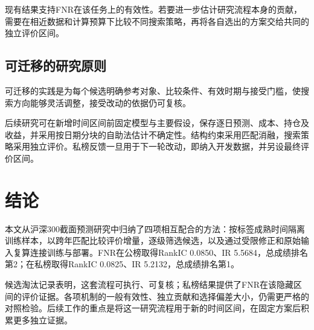\documentclass[UTF8,11pt,a4paper,fontset=fandol]{ctexart}
\begin{document}
现有结果支持FNR在该任务上的有效性。若要进一步估计研究流程本身的贡献，需要在相近数据和计算预算下比较不同搜索策略，再将各自选出的方案交给共同的独立评价区间。

\subsection{可迁移的研究原则}
可迁移的实践是为每个候选明确参考对象、比较条件、有效时期与接受门槛，使搜索方向能够灵活调整，接受改动的依据仍可复核。

后续研究可在新增时间区间前固定模型与主要假设，保存逐日预测、成本、持仓及收益，并采用按日期分块的自助法估计不确定性。结构约束采用匹配消融，搜索策略采用独立评价。私榜反馈一旦用于下一轮改动，即纳入开发数据，并另设最终评价区间。

\section{结论}
本文从沪深300截面预测研究中归纳了四项相互配合的方法：按标签成熟时间隔离训练样本，以跨年匹配比较评价增量，逐级筛选候选，以及通过受限修正和原始输入复算连接训练与部署。FNR在公榜取得RankIC 0.0850、IR 5.5684，总成绩排名第2；在私榜取得RankIC 0.0825、IR 5.2132，总成绩排名第1。

候选淘汰记录表明，这套流程可执行、可复核；私榜结果提供了FNR在该隐藏区间的评价证据。各项机制的一般有效性、独立贡献和选择偏差大小，仍需更严格的对照检验。后续工作的重点是将这一研究流程用于新的时间区间，在固定方案后积累更多独立证据。
\end{document}
